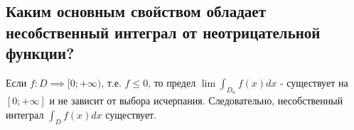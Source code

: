 
\subsection{Каким основным свойством обладает несобственный интеграл от неотрицательной функции?}

Если $f: D \implies [0; +\infty)$, т.е. $f \leq 0$, то предел $\lim \int_{D_n} f(x) dx$ - существует на $[0; +\infty]$ и не зависит от выбора исчерпания. Следовательно, несобственный интеграл $\int_{D} f(x) dx$ существует.
